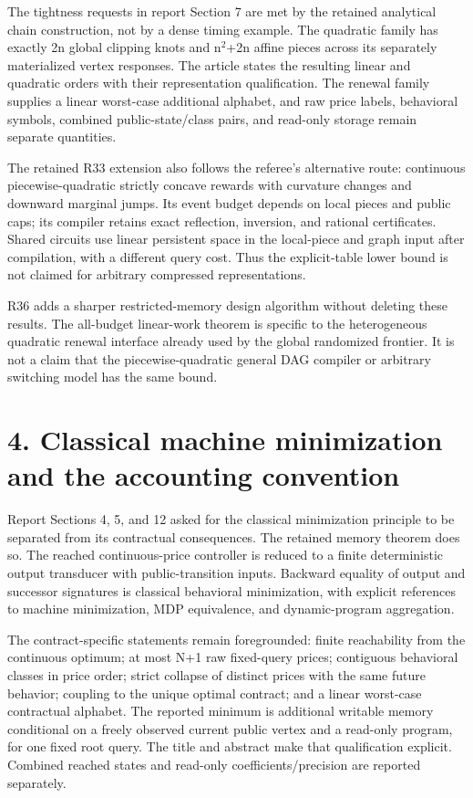 \documentclass[11pt,letterpaper]{article}
\begin{document}
The tightness requests in report Section 7 are met by the retained analytical chain construction, not by a dense timing example. The quadratic family has exactly 2n global clipping knots and n$^2$+2n affine pieces across its separately materialized vertex responses. The article states the resulting linear and quadratic orders with their representation qualification. The renewal family supplies a linear worst-case additional alphabet, and raw price labels, behavioral symbols, combined public-state/class pairs, and read-only storage remain separate quantities.


The retained R33 extension also follows the referee's alternative route: continuous piecewise-quadratic strictly concave rewards with curvature changes and downward marginal jumps. Its event budget depends on local pieces and public caps; its compiler retains exact reflection, inversion, and rational certificates. Shared circuits use linear persistent space in the local-piece and graph input after compilation, with a different query cost. Thus the explicit-table lower bound is not claimed for arbitrary compressed representations.


R36 adds a sharper restricted-memory design algorithm without deleting these results. The all-budget linear-work theorem is specific to the heterogeneous quadratic renewal interface already used by the global randomized frontier. It is not a claim that the piecewise-quadratic general DAG compiler or arbitrary switching model has the same bound.


\section*{4. Classical machine minimization and the accounting convention}

Report Sections 4, 5, and 12 asked for the classical minimization principle to be separated from its contractual consequences. The retained memory theorem does so. The reached continuous-price controller is reduced to a finite deterministic output transducer with public-transition inputs. Backward equality of output and successor signatures is classical behavioral minimization, with explicit references to machine minimization, MDP equivalence, and dynamic-program aggregation.


The contract-specific statements remain foregrounded: finite reachability from the continuous optimum; at most N+1 raw fixed-query prices; contiguous behavioral classes in price order; strict collapse of distinct prices with the same future behavior; coupling to the unique optimal contract; and a linear worst-case contractual alphabet. The reported minimum is additional writable memory conditional on a freely observed current public vertex and a read-only program, for one fixed root query. The title and abstract make that qualification explicit. Combined reached states and read-only coefficients/precision are reported separately.
\end{document}
